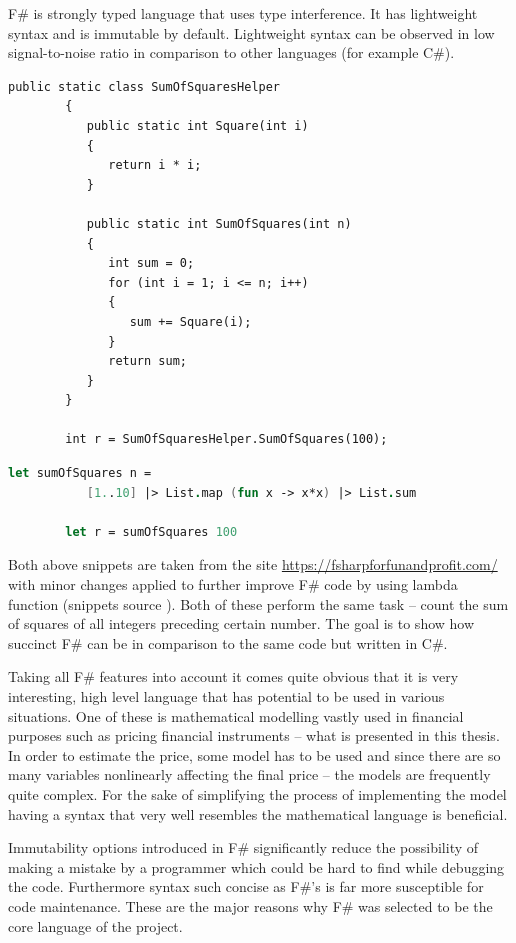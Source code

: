     F\# is strongly typed language that uses type interference. It has lightweight syntax and is immutable by default. Lightweight syntax can be observed in low signal-to-noise ratio in comparison to other languages (for example C\#).
    
    \begin{lstlisting}[caption=C\# code example]
        public static class SumOfSquaresHelper
        {
           public static int Square(int i)
           {
              return i * i;
           }
    
           public static int SumOfSquares(int n)
           {
              int sum = 0;
              for (int i = 1; i <= n; i++)
              {
                 sum += Square(i);
              }
              return sum;
           }
        }
        
        int r = SumOfSquaresHelper.SumOfSquares(100);
    \end{lstlisting}
    
    \begin{lstlisting}[language=FSharp, caption=F\# code example]
        let sumOfSquares n = 
           [1..10] |> List.map (fun x -> x*x) |> List.sum
        
        let r = sumOfSquares 100
    \end{lstlisting}
    
    Both above snippets are taken from the site \url{https://fsharpforfunandprofit.com/} with minor changes applied to further improve F\# code by using lambda function (snippets source \cite{compareCandF}). Both of these perform the same task -- count the sum of squares of all integers preceding certain number. The goal is to show how succinct F\# can be in comparison to the same code but written in C\#.
    
    Taking all F\# features into account it comes quite obvious that it is very interesting, high level language that has potential to be used in various situations. One of these is mathematical modelling vastly used in financial purposes such as pricing financial instruments -- what is presented in this thesis. In order to estimate the price, some model has to be used and since there are so many variables nonlinearly affecting the final price -- the models are frequently quite complex. For the sake of simplifying the process of implementing the model having a syntax that very well resembles the mathematical language is beneficial.
    
    Immutability options introduced in F\# significantly reduce the possibility of making a mistake by a programmer which could be hard to find while debugging the code. Furthermore syntax such concise as F\#'s is far more susceptible for code maintenance.
    These are the major reasons why F\# was selected to be the core language of the project.
